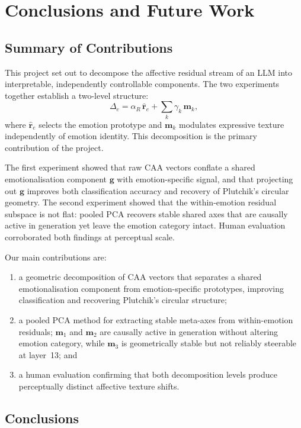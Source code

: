 \chapter{Conclusions and Future Work}
\label{chap:conclusion}

\section{Summary of Contributions}

This project set out to decompose the affective residual stream of an LLM into interpretable, independently controllable components. The two experiments together establish a two-level structure:
\[
\Delta_e = \alpha_R\,\hat{\mathbf{r}}_e + \sum_k \gamma_k\,\mathbf{m}_k,
\]
where $\hat{\mathbf{r}}_e$ selects the emotion prototype and $\mathbf{m}_k$ modulates expressive texture independently of emotion identity. This decomposition is the primary contribution of the project.

The first experiment showed that raw CAA vectors conflate a shared emotionalisation component $\mathbf{g}$ with emotion-specific signal, and that projecting out $\mathbf{g}$ improves both classification accuracy and recovery of Plutchik's circular geometry. The second experiment showed that the within-emotion residual subspace is not flat: pooled PCA recovers stable shared axes that are causally active in generation yet leave the emotion category intact. Human evaluation corroborated both findings at perceptual scale.

Our main contributions are: 
\begin{enumerate}
    \item a geometric decomposition of CAA vectors that separates a shared emotionalisation component from emotion-specific prototypes, improving classification and recovering Plutchik's circular structure;
    \item a pooled PCA method for extracting stable meta-axes from within-emotion residuals; $\mathbf{m}_1$ and $\mathbf{m}_2$ are causally active in generation without altering emotion category, while $\mathbf{m}_3$ is geometrically stable but not reliably steerable at layer~13; and
    \item a human evaluation confirming that both decomposition levels produce perceptually distinct affective texture shifts.
\end{enumerate}

\section{Conclusions}

